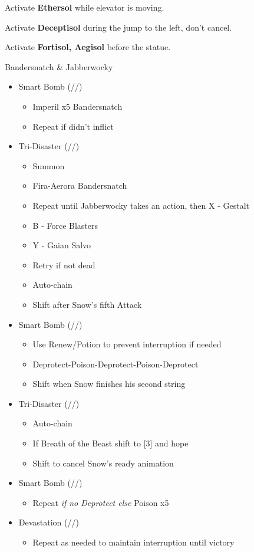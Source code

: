Activate \textbf{Ethersol} while elevator is moving.

Activate \textbf{Deceptisol} during the jump to the left, don't cancel.

Activate \textbf{Fortisol, Aegisol} before the statue.

\renewcommand{\second}{[2] Devastation (\sab/\com/\com)}
\renewcommand{\fifth}{[5] Smart Bomb (\sab/\rav/\rav)}
\renewcommand{\sixth}{[6] Tri-Disaster (\rav/\rav/\rav)}
\begin{battle}{Bandersnatch \& Jabberwocky}
\begin{itemize}
    \item \fifth
    \begin{itemize}
        \item Imperil x5 Bandersnatch
        \item Repeat if didn't inflict
    \end{itemize}
    \item \sixth
    \begin{itemize}
        \item Summon
        \item Fira-Aerora Bandersnatch
        \item Repeat until Jabberwocky takes an action, then X - Gestalt
        \item B - Force Blasters
        \item Y - Gaian Salvo
        \item Retry if not dead
        \item Auto-chain
        \item Shift after Snow's fifth Attack
    \end{itemize}
    \item \fifth
    \begin{itemize}
        \item Use Renew/Potion to prevent interruption if needed
        \item Deprotect-Poison-Deprotect-Poison-Deprotect
        \item Shift when Snow finishes his second string
    \end{itemize}
    \item \sixth
    \begin{itemize}
        \item Auto-chain
        \item If Breath of the Beast shift to [3] and hope
        \item Shift to cancel Snow's ready animation
    \end{itemize}
    \item \fifth
    \begin{itemize}
        \item Repeat \textit{if no Deprotect else } Poison x5
    \end{itemize}
    \item \second
    \begin{itemize}
        \item Repeat as needed to maintain interruption until victory
    \end{itemize}
\end{itemize}
\end{battle}

